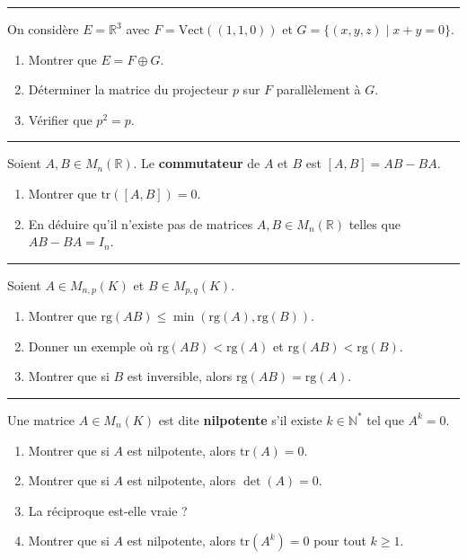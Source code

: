 \documentclass[../PolyS4.tex]{subfiles}
\begin{document}
\vspace{1em}
\hrule
\vspace{1em}

\newpage


On considère $E = \mathbb{R}^3$ avec $F = \text{Vect}((1, 1, 0))$ et $G = \{(x, y, z) \mid x + y = 0\}$.
\begin{enumerate}
    \item Montrer que $E = F \oplus G$.
    \item Déterminer la matrice du projecteur $p$ sur $F$ parallèlement à $G$.
    \item Vérifier que $p^2 = p$.
\end{enumerate}

\vspace{1em}
\hrule
\vspace{1em}


Soient $A, B \in M_n(\mathbb{R})$. Le \textbf{commutateur} de $A$ et $B$ est $[A, B] = AB - BA$.
\begin{enumerate}
    \item Montrer que $\text{tr}([A, B]) = 0$.
    \item En déduire qu'il n'existe pas de matrices $A, B \in M_n(\mathbb{R})$ telles que $AB - BA = I_n$.
\end{enumerate}

\vspace{1em}
\hrule
\vspace{1em}


Soient $A \in M_{n,p}(K)$ et $B \in M_{p,q}(K)$.
\begin{enumerate}
    \item Montrer que $\text{rg}(AB) \leq \min(\text{rg}(A), \text{rg}(B))$.
    \item Donner un exemple où $\text{rg}(AB) < \text{rg}(A)$ et $\text{rg}(AB) < \text{rg}(B)$.
    \item Montrer que si $B$ est inversible, alors $\text{rg}(AB) = \text{rg}(A)$.
\end{enumerate}

\vspace{1em}
\hrule
\vspace{1em}


Une matrice $A \in M_n(K)$ est dite \textbf{nilpotente} s'il existe $k \in \mathbb{N}^*$ tel que $A^k = 0$.
\begin{enumerate}
    \item Montrer que si $A$ est nilpotente, alors $\text{tr}(A) = 0$.
    \item Montrer que si $A$ est nilpotente, alors $\det(A) = 0$.
    \item La réciproque est-elle vraie ?
    \item Montrer que si $A$ est nilpotente, alors $\text{tr}(A^k) = 0$ pour tout $k \geq 1$.
\end{enumerate}
\end{document}
